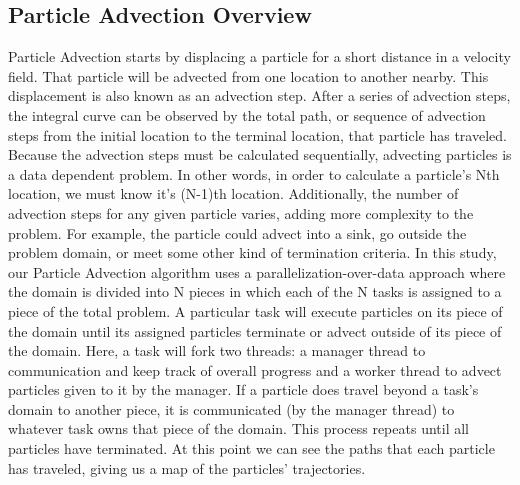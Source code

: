 \documentclass{IEEEtran}
\begin{document}
\subsection{Particle Advection Overview}
Particle Advection starts by displacing a particle for a short distance in a velocity field.
%
That particle will be advected from one location to another nearby.
%
This displacement is also known as an advection step.
%
After a series of advection steps, the integral curve can be observed by the total path, or sequence of advection steps from the initial location to the terminal location, that particle has traveled.
%
Because the advection steps must be calculated sequentially, advecting particles is a data dependent problem.
%
In other words, in order to calculate a particle's Nth location, we must know it's (N-1)th location.
%
Additionally, the number of advection steps for any given particle varies, adding more complexity to the problem.
%
For example, the particle could advect into a sink, go outside the problem domain, or meet some other kind of termination criteria.
%
In this study, our Particle Advection algorithm uses a parallelization-over-data approach where the domain is divided into N pieces in which each of the N tasks is assigned to a piece of the total problem.
%
A particular task will execute particles on its piece of the domain until its assigned particles terminate or advect outside of its piece of the domain.
%
Here, a task will fork two threads: a manager thread to communication and keep track of overall progress and a worker thread to advect particles given to it by the manager.
%
If a particle does travel beyond a task's domain to another piece, it is communicated (by the manager thread) to whatever task owns that piece of the domain.
%
This process repeats until all particles have terminated.
%
At this point we can see the paths that each particle has traveled, giving us a map of the particles' trajectories.
%
\end{document}
